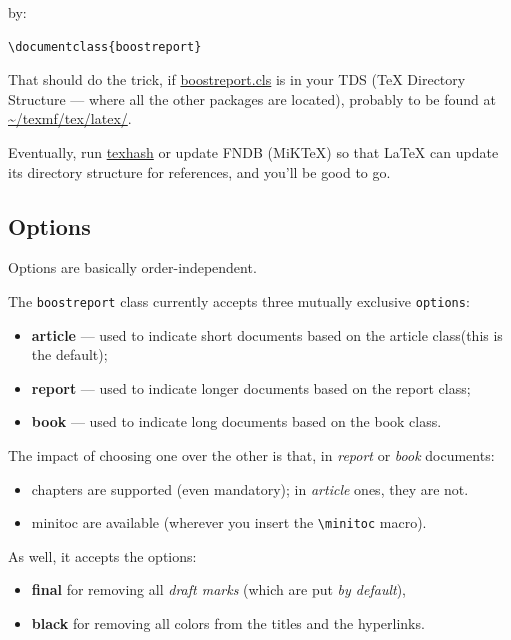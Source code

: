 \documentclass{boostreport}
\begin{document}
by:

\begin{verbatim}
\documentclass{boostreport}
\end{verbatim}

That should do the trick, if \url{boostreport.cls} is in your \acs{TDS} (\TeX{}
Directory Structure --- where all the other packages are located), probably
to be found at \url{~/texmf/tex/latex/}.

Eventually, run \url{texhash} or update FNDB (MiKTeX) so that \LaTeX{} can
update its directory structure for references, and you'll be good to go.

\subsection{Options}
\label{sec:options}

Options are basically order-independent.

The \texttt{boostreport} class currently accepts three mutually exclusive
\texttt{options}:

\begin{itemize}
    \item \textbf{article} --- used to indicate short documents based on the
    \textsf{article} class(this is the default);
    \item \textbf{report} --- used to indicate longer documents based on the
    \textsf{report} class;
    \item \textbf{book} --- used to indicate long documents based on the
    \textsf{book} class.
\end{itemize}

The impact of choosing one over the other is that, in \emph{report} or
\emph{book} documents:

\begin{itemize}
    \item chapters are supported (even mandatory); in \emph{article} ones,
    they are not.
    \item minitoc are available (wherever you insert the \verb|\minitoc|
    macro).
\end{itemize}

As well, it accepts the options:

\begin{itemize}
    \item \textbf{final} for removing all \textit{draft marks} (which are put
    \emph{by default}),
    \item \textbf{black} for removing all colors from the titles and the
    hyperlinks.
\end{itemize}
\end{document}
